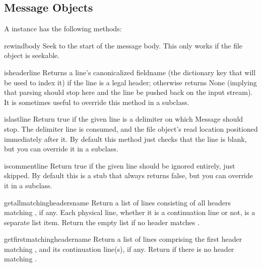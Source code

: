 \subsection{Message Objects \label{message-objects}}

A  instance has the following methods:

\begin{methoddesc}{rewindbody}{}
Seek to the start of the message body.  This only works if the file
object is seekable.
\end{methoddesc}

\begin{methoddesc}{isheader}{line}
Returns a line's canonicalized fieldname (the dictionary key that will
be used to index it) if the line is a legal  header; otherwise
returns None (implying that parsing should stop here and the line be
pushed back on the input stream).  It is sometimes useful to override
this method in a subclass.
\end{methoddesc}

\begin{methoddesc}{islast}{line}
Return true if the given line is a delimiter on which Message should
stop.  The delimiter line is consumed, and the file object's read
location positioned immediately after it.  By default this method just
checks that the line is blank, but you can override it in a subclass.
\end{methoddesc}

\begin{methoddesc}{iscomment}{line}
Return true if the given line should be ignored entirely, just skipped.
By default this is a stub that always returns false, but you can
override it in a subclass.
\end{methoddesc}

\begin{methoddesc}{getallmatchingheaders}{name}
Return a list of lines consisting of all headers matching
, if any.  Each physical line, whether it is a continuation
line or not, is a separate list item.  Return the empty list if no
header matches .
\end{methoddesc}

\begin{methoddesc}{getfirstmatchingheader}{name}
Return a list of lines comprising the first header matching
, and its continuation line(s), if any.  Return
 if there is no header matching .
\end{methoddesc}

